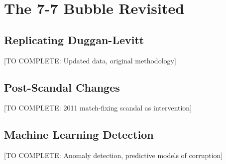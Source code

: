 \section{The 7-7 Bubble Revisited}

\subsection{Replicating Duggan-Levitt}

[TO COMPLETE: Updated data, original methodology]

\subsection{Post-Scandal Changes}

[TO COMPLETE: 2011 match-fixing scandal as intervention]

\subsection{Machine Learning Detection}

[TO COMPLETE: Anomaly detection, predictive models of corruption]